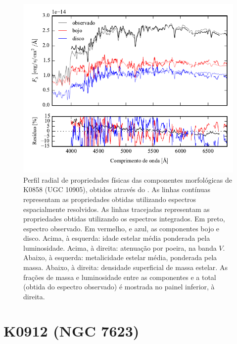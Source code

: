 \begin{figure}
	\includegraphics[page=16]{figuras/sample006a_synthesis}
	\caption[Propriedades físicas das componentes morfológicas de K0858 (UGC 10905)]
	{Perfil radial de propriedades físicas das componentes morfológicas de
	K0858 (UGC 10905), obtidos através do \starlight. As linhas contínuas
	representam as propriedades obtidas utilizando espectros espacialmente
	resolvidos. As linhas tracejadas representam as propriedades obtidas utilizando
	os espectros integrados. Em preto, espectro observado. Em vermelho, e azul, as
	componentes bojo e disco. Acima, à esquerda: idade estelar média ponderada pela
	luminosidade. Acima, à direita: atenuação por poeira, na banda $V$. Abaixo, à
	esquerda: metalicidade estelar média, ponderada pela massa. Abaixo, à direita:
	densidade superficial de massa estelar. As frações de massa e luminosidade
	entre as componentes e a total (obtida do espectro observado) é mostrada no
	painel inferior, à direita.}
	\label{fig:decompSinteseRadprof:K0858}
\end{figure}



\section{K0912 (NGC 7623)}
\label{apendice:Decomp:K0912}

